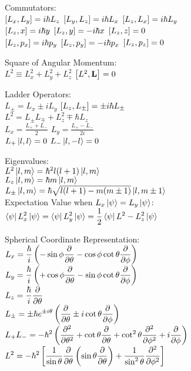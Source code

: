 \documentclass[12pt,landscape]{article}
\newcommand{\tab}{\hspace{.02\textwidth}}
\newcommand{\ds}{\displaystyle}
\begin{document}
\begin{multicols}{3}
Commutators:\\
\tab $\comm{L_x}{L_y} = i\hbar L_z$ \quad $\comm{L_y}{L_z} = i\hbar L_x$ \quad $\comm{L_z}{L_x} = i\hbar L_y$\\
\tab $\comm{L_z}{x} = i\hbar y$ \quad $\comm{L_z}{y} = -i\hbar x$ \quad $\comm{L_z}{z} = 0$\\
\tab $\comm{L_z}{p_x} = i\hbar p_y$ \quad $\comm{L_z}{p_y} = -i\hbar p_x$ \quad $\comm{L_z}{p_z} = 0$

Square of Angular Momentum:\\
\tab $L^2 \equiv L_x^2 + L_y^2 + L_z^2$ \qquad $\comm{L^2}{\vb{L}} = 0$

Ladder Operators:\\
\tab $L_\pm = L_x \pm iL_y$ \qquad $\comm{L_z}{L_\pm} = \pm i\hbar L_\pm$\\
\tab $L^2 = L_\pm L_\mp + L_z^2 \mp \hbar L_z$\\
\tab $\ds L_x = \frac{L_+ + L_-}{2}$ \qquad $\ds L_y = \frac{L_+ - L_-}{2i}$\\
\tab $L_+ \ket{l,l} = 0$ \qquad $L_- \ket{l,-l} =0$

Eigenvalues:\\
\tab $L^2 \ket{l,m} = \hbar^2 l(l+1)\ket{l,m}$\\
\tab $L_z \ket{l,m} = \hbar m \ket{l,m}$\\
\tab $L_\pm \ket{l,m} = \hbar \sqrt{l(l+1) - m(m\pm 1)}\ket{l,m\pm1}$\\

Expectation Value when $L_x\ket{\psi} = L_y\ket{\psi}$:\\
\tab $\ds \bra{\psi}L_x^2\ket{\psi} = \bra{\psi}L_y^2\ket{\psi} = \frac{1}{2}\bra{\psi}L^2 - L_z^2\ket{\psi}$

Spherical Coordinate Representation:\\
\tab $L_x = \ds \frac{\hbar}{i}\left(-\sin\phi \pdv{\theta} - \cos\phi\cot\theta\pdv{\phi}\right)$\\
\tab $L_y = \ds \frac{\hbar}{i}\left(+\cos\phi \pdv{\theta} - \sin\phi\cot\theta\pdv{\phi}\right)$\\
\tab $\ds L_z = \frac{\hbar}{i}\pdv{\theta}$\\
\tab $\ds L_\pm = \pm\hbar e^{\pm i \theta}\left(\pdv{\theta} \pm i\cot\theta\pdv{\phi}\right)$\\
\tab $\ds L_+L_- = -\hbar^2\left(\pdv[2]{\theta}+\cot\theta\pdv{\theta} + \cot^2\theta\pdv[2]{\phi} + i\pdv{\phi}\right)$\\
\tab $\ds L^2 = -\hbar^2\left[\frac{1}{\sin\theta}\pdv{\theta}\left(\sin\theta\pdv{\theta}\right) + \frac{1}{\sin^2\theta}\pdv[2]{\phi}\right]$


\end{multicols}
\end{document}
